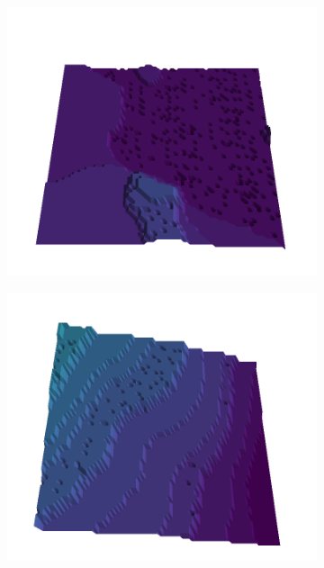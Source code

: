 \begin{figure}[H]
    \begin{subfigure}[b]{0.19\textwidth}
        \includegraphics[width=\linewidth]{../img/5/quarry/best//patch-3d-majavi-colormap-0.png}
    \end{subfigure}
    \begin{subfigure}[b]{0.19\textwidth}
        \includegraphics[width=\linewidth]{../img/5/quarry/best//patch-3d-majavi-colormap-1.png}
    \end{subfigure}  

\end{figure}
